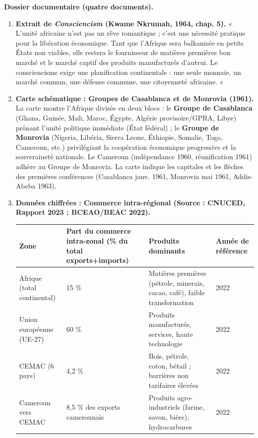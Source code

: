 \documentclass[11pt]{article}
\begin{document}
\textbf{Dossier documentaire (quatre documents).}

\begin{enumerate}
    \item \textbf{Extrait de \emph{Consciencism} (Kwame Nkrumah, 1964, chap. 5).} « L'unité africaine n'est pas un rêve romantique ; c'est une nécessité pratique pour la libération économique. Tant que l'Afrique sera balkanisée en petits États non viables, elle restera le fournisseur de matières premières bon marché et le marché captif des produits manufacturés d'autrui. Le consciencisme exige une planification continentale : une seule monnaie, un marché commun, une défense commune, une citoyenneté africaine. »
    
    \item \textbf{Carte schématique : Groupes de Casablanca et de Monrovia (1961).} La carte montre l'Afrique divisée en deux blocs : le \textbf{Groupe de Casablanca} (Ghana, Guinée, Mali, Maroc, Égypte, Algérie provisoire/GPRA, Libye) prônant l'unité politique immédiate (État fédéral) ; le \textbf{Groupe de Monrovia} (Nigeria, Libéria, Sierra Leone, Éthiopie, Somalie, Togo, Cameroun, etc.) privilégiant la coopération économique progressive et la souveraineté nationale. Le Cameroun (indépendance 1960, réunification 1961) adhère au Groupe de Monrovia. La carte indique les capitales et les flèches des premières conférences (Casablanca janv. 1961, Monrovia mai 1961, Addis-Abeba 1963).
    
    \item \textbf{Données chiffrées : Commerce intra-régional (Source : CNUCED, Rapport 2023 ; BCEAO/BEAC 2022).}
    \begin{center}
    \begin{tabularx}{\linewidth}{|l|X|X|X|}\hline
    \rowcolor{popblueL}
    \textbf{Zone} & \textbf{Part du commerce intra-zonal (\% du total exports+imports)} & \textbf{Produits dominants} & \textbf{Année de référence} \\ \hline
    Afrique (total continental) & 15 \% & Matières premières (pétrole, minerais, cacao, café), faible transformation & 2022 \\ \hline
    Union européenne (UE-27) & 60 \% & Produits manufacturés, services, haute technologie & 2022 \\ \hline
    CEMAC (6 pays) & 4,2 \% & Bois, pétrole, coton, bétail ; barrières non tarifaires élevées & 2022 \\ \hline
    Cameroun vers CEMAC & 8,5 \% des exports camerounais & Produits agro-industriels (farine, savon, bière), hydrocarbures & 2022 \\ \hline
    \end{tabularx}
    \end{center}
    

\end{enumerate}
\end{document}
